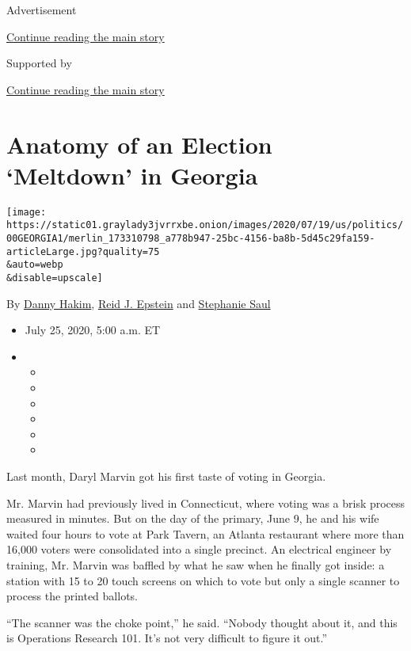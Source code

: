 Advertisement

\protect\hyperlink{after-top}{Continue reading the main story}

Supported by

\protect\hyperlink{after-sponsor}{Continue reading the main story}

\hypertarget{anatomy-of-an-election-meltdown-in-georgia}{%
\section{Anatomy of an Election `Meltdown' in
Georgia}\label{anatomy-of-an-election-meltdown-in-georgia}}

\texttt{[image: https://static01.graylady3jvrrxbe.onion/images/2020/07/19/us/politics/00GEORGIA1/merlin\_173310798\_a778b947-25bc-4156-ba8b-5d45c29fa159-articleLarge.jpg?quality=75\\\&auto=webp\\\&disable=upscale]}

By \href{https://www.nytimes3xbfgragh.onion/by/danny-hakim}{Danny
Hakim}, \href{https://www.nytimes3xbfgragh.onion/by/reid-j-epstein}{Reid
J. Epstein} and
\href{https://www.nytimes3xbfgragh.onion/by/stephanie-saul}{Stephanie
Saul}

\begin{itemize}
\item
  July 25, 2020, 5:00 a.m. ET
\item
  \begin{itemize}
  \item
  \item
  \item
  \item
  \item
  \item
  \end{itemize}
\end{itemize}

Last month, Daryl Marvin got his first taste of voting in Georgia.

Mr. Marvin had previously lived in Connecticut, where voting was a brisk
process measured in minutes. But on the day of the primary, June 9, he
and his wife waited four hours to vote at Park Tavern, an Atlanta
restaurant where more than 16,000 voters were consolidated into a single
precinct. An electrical engineer by training, Mr. Marvin was baffled by
what he saw when he finally got inside: a station with 15 to 20 touch
screens on which to vote but only a single scanner to process the
printed ballots.

``The scanner was the choke point,'' he said. ``Nobody thought about it,
and this is Operations Research 101. It's not very difficult to figure
it out.''

